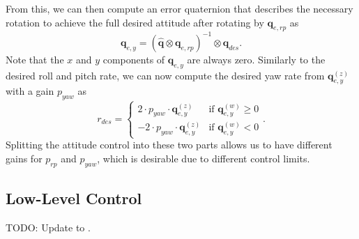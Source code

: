 \documentclass[10pt,a4paper,fleqn]{article}
\newcommand{\bVec}[1]{\mathbf{#1}}
\begin{document}
From this, we can then compute an error quaternion that describes the necessary rotation to achieve the full desired attitude after rotating by $\bVec{q}_{e,rp}$ as
%
\begin{equation}
	\bVec{q}_{e,y} = (\hat{\bVec{q}} \otimes \bVec{q}_{e,rp})^{-1} \otimes \bVec{q}_{des}.
\end{equation}
%
Note that the $x$ and $y$ components of $\bVec{q}_{e,y}$ are always zero.
Similarly to the desired roll and pitch rate, we can now compute the desired yaw rate from $\bVec{q}_{e,y}^{(z)}$ with a gain $p_{yaw}$ as
%
\begin{equation}
	r_{des} = \begin{cases} 2 \cdot p_{yaw} \cdot \bVec{q}_{e,y}^{(z)} &\mbox{if } \bVec{q}_{e,y}^{(w)} \geq 0 \\
						- 2 \cdot p_{yaw} \cdot \bVec{q}_{e,y}^{(z)} &\mbox{if } \bVec{q}_{e,y}^{(w)} < 0 
					\end{cases}.
\end{equation}
%
Splitting the attitude control into these two parts allows us to have different gains for $p_{rp}$ and $p_{yaw}$, which is desirable due to different control limits.

\subsection{Low-Level Control} \label{sec:low_level_cont}

TODO: Update to \cite{Faessler17ral}.
\end{document}
